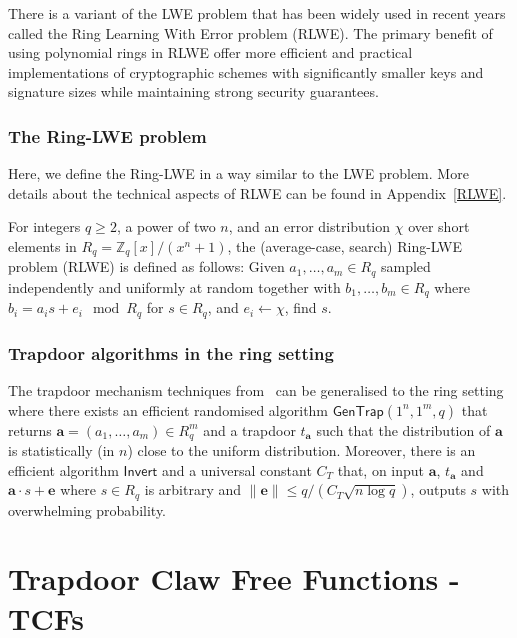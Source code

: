 \documentclass[cryptography,review,submit,pdftex,moreauthors,amsmath,amssymb,aps,strict]{Definitions/mdpi}
\newcommand{\minh}[1]{\textcolor{blue}{#1}}
\begin{document}
There is a variant of the LWE problem that has been widely used in recent years called the Ring Learning With Error problem (RLWE). The primary benefit of using polynomial rings in RLWE offer more efficient and practical implementations of cryptographic schemes with significantly smaller keys and signature sizes while maintaining strong security guarantees.


\subsubsection{The Ring-LWE problem}
Here, we define the Ring-LWE in a way similar to the LWE problem. More details about the technical aspects of RLWE can be found in Appendix~\ref{RLWE}.

For integers $q\geq 2$, a power of two $n$, and an error distribution $\chi$ over short elements in $R_q = \mathbb{Z}_q[x]/(x^n+1)$, the (average-case, search) Ring-LWE problem (RLWE) is defined as follows: 
Given $a_1,\dots, a_{m}\in R_q$ sampled independently and uniformly at random together with $b_1,\dots,b_{m}\in R_q$ where $b_i=a_i s + e_i \mod R_q$ for $s\in R_q$, and $e_i\gets \chi$, find $s$.


\subsubsection{Trapdoor algorithms in the ring setting}

The trapdoor mechanism techniques from~\cite{MP12} can be generalised to the ring setting where there exists an efficient randomised algorithm $\mathsf{GenTrap}(1^n,1^m,q)$ that returns $\mathbf{a}=(a_1,\dots,a_m)\in R^{m}_q$ and a trapdoor $t_{\mathbf{a}}$ such that the distribution of $\mathbf{a}$ is statistically (in $n$) close to the uniform distribution. Moreover, there is an efficient algorithm $\mathsf{Invert}$ and a universal constant $C_T$ that, on input $\mathbf{a}$, $t_{\mathbf{a}}$ and $\mathbf{a}\cdot s+\mathbf{e}$ where $s \in R_q$ is arbitrary and $\|\mathbf{e}\|\leq q/(C_T\sqrt{n\log q})$, outputs $s$ with overwhelming probability.

\section{Trapdoor Claw Free Functions - TCFs} \label{tfcs}
\end{document}

